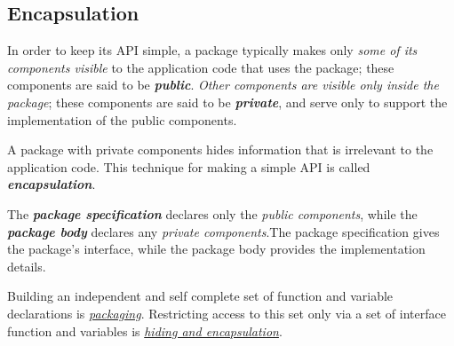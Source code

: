 \subsection{Encapsulation}
\label{subsec:encapsulation}

In order to keep its API simple, a package typically makes only \textit{some of its components visible} to the application code that uses the package; these components are said to be \textit{\textbf{public}}. \textit{Other components are visible only inside the package}; these
components are said to be \textit{\textbf{private}}, and serve only to support the implementation of the public components.

A package with private components hides information that is irrelevant to the application code. This technique for making a simple API is called \textit{\textbf{encapsulation}}.

The \textit{\textbf{package specification}} declares only the \textit{public components}, while the \textit{\textbf{package body}} declares any \textit{private components}.The package specification gives the package's interface, while the package body provides the implementation details.

Building an independent and self complete set of function and variable declarations is \underline{\textit{packaging}}. Restricting access to this set only via a set of interface
function and variables is \underline{\textit{hiding and encapsulation}}.

\begin{figure}[H]
  \centering
\end{figure}

